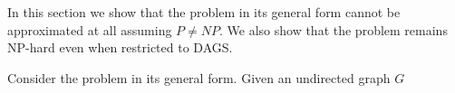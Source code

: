 In this section we show that the problem in its general form cannot be
approximated at all assuming $P \neq NP$.
We also show that the problem remains NP-hard even when restricted to DAGS.

Consider the problem in its general form. 
Given an undirected graph $G$
